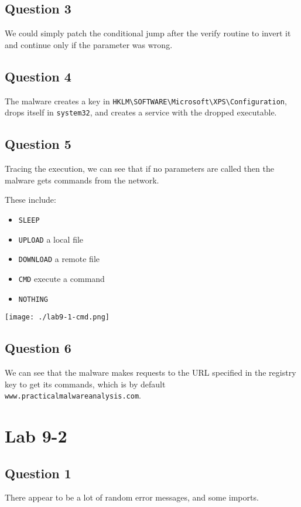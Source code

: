 \documentclass[11pt]{article}
\begin{document}
\subsection{Question 3}
\label{sec:org6239c7d}
We could simply patch the conditional jump after the verify routine to
invert it and continue only if the parameter was wrong.
\subsection{Question 4}
\label{sec:orgb390e06}
The malware creates a key in
\texttt{HKLM\textbackslash{}SOFTWARE\textbackslash{}Microsoft\textbackslash{}XPS\textbackslash{}Configuration}, drops itself in
\texttt{system32}, and creates a service with the dropped executable.
\subsection{Question 5}
\label{sec:orga2f801f}
Tracing the execution, we can see that if no parameters are called
then the malware gets commands from the network.

These include:
\begin{itemize}
\item \texttt{SLEEP}
\item \texttt{UPLOAD} a local file
\item \texttt{DOWNLOAD} a remote file
\item \texttt{CMD} execute a command
\item \texttt{NOTHING}
\end{itemize}

\begin{center}
\texttt{[image: ./lab9-1-cmd.png]}
\end{center}
\subsection{Question 6}
\label{sec:org1233ad7}
We can see that the malware makes requests to the URL specified in the
registry key to get its commands, which is by default \texttt{www.practicalmalwareanalysis.com}.
\section{Lab 9-2}
\label{sec:org656b687}
\subsection{Question 1}
\label{sec:org7c28a81}
There appear to be a lot of random error messages, and some imports.
\end{document}
